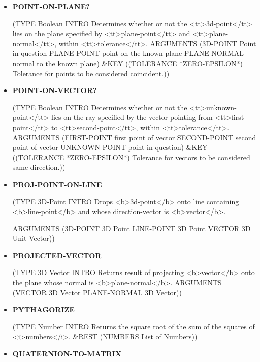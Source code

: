 \documentclass [11pt]{book}
\begin{document}
\begin{itemize}
\item {}
\label{prim:point-on-plane?}
\textbf{POINT-ON-PLANE?}

(TYPE Boolean INTRO  Determines whether or not the <tt>3d-point</tt> lies on the plane specified by <tt>plane-point</tt>
and <tt>plane-normal</tt>, within <tt>tolerance</tt>.
 ARGUMENTS (3D-POINT Point in question PLANE-POINT point on the known plane PLANE-NORMAL normal to the known plane) \&KEY ((TOLERANCE *ZERO-EPSILON*) Tolerance for points to be considered coincident.))



\item {}
\label{prim:point-on-vector?}
\textbf{POINT-ON-VECTOR?}

(TYPE Boolean INTRO  Determines whether or not the <tt>unknown-point</tt> lies on the ray specified by the vector
pointing from <tt>first-point</tt> to <tt>second-point</tt>, within <tt>tolerance</tt>.
 ARGUMENTS (FIRST-POINT first point of vector SECOND-POINT second point of vector UNKNOWN-POINT point in question) \&KEY ((TOLERANCE *ZERO-EPSILON*) Tolerance for vectors to be considered same-direction.))



\item {}
\label{prim:proj-point-on-line}
\textbf{PROJ-POINT-ON-LINE}

(TYPE 3D-Point INTRO  Drops <b>3d-point</b> onto line containing <b>line-point</b>
and whose direction-vector is <b>vector</b>.

 ARGUMENTS (3D-POINT 3D Point LINE-POINT 3D Point VECTOR 3D Unit Vector))



\item {}
\label{prim:projected-vector}
\textbf{PROJECTED-VECTOR}

(TYPE 3D Vector INTRO  Returns result of projecting <b>vector</b> onto the plane whose normal
is <b>plane-normal</b>.
 ARGUMENTS (VECTOR 3D Vector PLANE-NORMAL 3D Vector))



\item {}
\label{prim:pythagorize}
\textbf{PYTHAGORIZE}

(TYPE Number INTRO  Returns the square root of the sum of the squares of <i>numbers</i>.
 \&REST (NUMBERS List of Numbers))



\item {}
\label{prim:quaternion-to-matrix}
\textbf{QUATERNION-TO-MATRIX}


\end{itemize}
\end{document}
